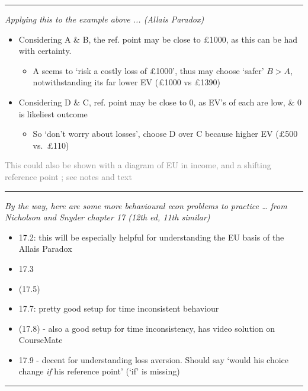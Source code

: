\documentclass[]{article}
\providecommand{\tightlist}{%
  \setlength{\itemsep}{0pt}\setlength{\parskip}{0pt}}
\begin{document}
\begin{center}\rule{0.5\linewidth}{\linethickness}\end{center}

\bigskip

\textit{Applying this to the example above ... (Allais Paradox)}

\begin{itemize}
\item
  Considering A \& B, the ref. point may be close to \pounds1000, as this can be had with certainty.

  \begin{itemize}
  \tightlist
  \item
    A seems to `risk a costly loss of \pounds1000', thus may choose `safer' \(B>A\), notwithstanding its far lower EV (\pounds1000 vs \pounds1390)
  \end{itemize}
\end{itemize}

\bigskip

\begin{itemize}
\item
  Considering D \& C, ref. point may be close to 0, as EV's of each are low, \& 0 is likeliest outcome

  \begin{itemize}
  \tightlist
  \item
    So `don't worry about losses', choose D over C because higher EV (\pounds500 vs.~\pounds110)
  \end{itemize}
\end{itemize}

\textcolor{gray}{This could also be shown with a diagram of EU in income, and a  shifting reference point ; see notes and text}

\begin{center}\rule{0.5\linewidth}{\linethickness}\end{center}

\emph{By the way, here are some more behavioural econ problems to practice \ldots{} from Nicholson and Snyder chapter 17 (12th ed, 11th similar)}

\begin{itemize}
\tightlist
\item
  17.2: this will be especially helpful for understanding the EU basis of the Allais Paradox
\item
  17.3
\item
  (17.5)
\item
  17.7: pretty good setup for time inconsistent behaviour
\item
  (17.8) - also a good setup for time inconsistency, has video solution on CourseMate
\item
  17.9 - decent for understanding loss aversion. Should say `would his choice change \emph{if} his reference point' (`if' is missing)
\end{itemize}

\begin{center}\rule{0.5\linewidth}{\linethickness}\end{center}
\end{document}
